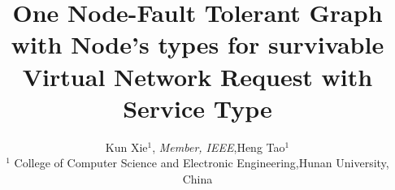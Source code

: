 \documentclass[10pt,journal,letterpaper]{IEEEtran}
\begin{document}
\title{One Node-Fault Tolerant Graph with Node's types for survivable Virtual Network Request with Service Type}
\author{Kun Xie$^1$, \emph{Member, IEEE},Heng Tao$^1$\\
$^1$ College of Computer Science and Electronic Engineering,Hunan University, China\\}

\maketitle
\vspace{-3em}




%
%







\end{document}
